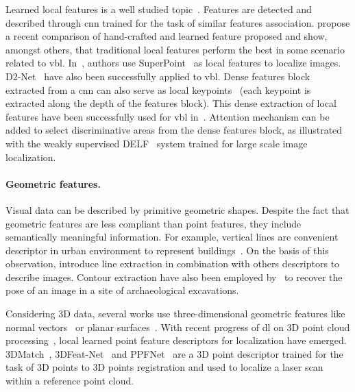 	        Learned local features is a well studied topic~\citep{Carlevaris-Bianco2014,Paulin2015,Yi2016a,Ono2018a,Dusmanu2019,DeTone2017,Detone2018}. Features are detected and described through \ac{cnn} trained for the task of similar features association. \citet{Schonberger2017} propose a recent comparison of hand-crafted and learned feature proposed and show, amongst others, that traditional local features perform the best in some scenario related to \ac{vbl}. In~\cite{Sarlin2018a}, authors use SuperPoint~\citep{Detone2018} as local features to localize images. D2-Net~\citep{Dusmanu2019} have also been successfully applied to \ac{vbl}. Dense features block extracted from a \ac{cnn} can also serve as local keypoints~\citep{Widya2018} (each keypoint is extracted along the depth of the features block). This dense extraction of local features have been successfully used for \ac{vbl} in~\citep{Piasco2019a,Taira2018}. Attention mechanism can be added to select discriminative areas from the dense features block, as illustrated with the weakly supervised DELF~\citep{Noh2017} system trained for large scale image localization.

		\paragraph{Geometric features.}
		 	Visual data can be described by primitive geometric shapes. Despite the fact that geometric features are less compliant than point features, they include semantically meaningful information. For example, vertical lines are convenient descriptor in urban environment to represent buildings~\citep{Arth2015,Morago2016,Ramalingam2011}. On the basis of this observation, \citet{Hays2008} introduce line extraction in combination with others descriptors to describe images.  Contour extraction have also been employed by~\citet{Russell2011} to recover the pose of an image in a site of archaeological excavations. 
		 	
		 	Considering 3D data, several works use three-dimensional geometric features like normal vectors~\citep{Li2016} or planar surfaces~\citep{Fernandez-Moral2013}. With recent progress of \ac{dl} on 3D point cloud processing~\citep{Qi2016a}, local learned point feature descriptors for localization have emerged. 3DMatch~\citep{Zeng2016}, 3DFeat-Net~\citep{Yew2018} and PPFNet~\citep{Deng2018} are a 3D point descriptor trained for the task of 3D points to 3D points registration and used to localize a laser scan within a reference point cloud.
			
